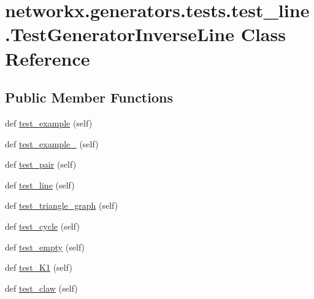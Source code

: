 \hypertarget{classnetworkx_1_1generators_1_1tests_1_1test__line_1_1TestGeneratorInverseLine}{}\section{networkx.\+generators.\+tests.\+test\+\_\+line.\+Test\+Generator\+Inverse\+Line Class Reference}
\label{classnetworkx_1_1generators_1_1tests_1_1test__line_1_1TestGeneratorInverseLine}
\subsection*{Public Member Functions}
\begin{DoxyCompactItemize}
\item 
def \hyperlink{classnetworkx_1_1generators_1_1tests_1_1test__line_1_1TestGeneratorInverseLine_ae43d20786b51e5f61dabfa7b3142d4b0}{test\+\_\+example} (self)
\item 
def \hyperlink{classnetworkx_1_1generators_1_1tests_1_1test__line_1_1TestGeneratorInverseLine_abacb88eeade01b3c8337c685ba076bc1}{test\+\_\+example\+\_} (self)
\item 
def \hyperlink{classnetworkx_1_1generators_1_1tests_1_1test__line_1_1TestGeneratorInverseLine_a4d26eb74ffa49fd4e2bc549fc891de16}{test\+\_\+pair} (self)
\item 
def \hyperlink{classnetworkx_1_1generators_1_1tests_1_1test__line_1_1TestGeneratorInverseLine_aa2f8fe49ca305949514541aa38909f74}{test\+\_\+line} (self)
\item 
def \hyperlink{classnetworkx_1_1generators_1_1tests_1_1test__line_1_1TestGeneratorInverseLine_abc7af832f01b25a51948c7abd44c7343}{test\+\_\+triangle\+\_\+graph} (self)
\item 
def \hyperlink{classnetworkx_1_1generators_1_1tests_1_1test__line_1_1TestGeneratorInverseLine_ab15f1cf1f711f0507222b94ee1c44099}{test\+\_\+cycle} (self)
\item 
def \hyperlink{classnetworkx_1_1generators_1_1tests_1_1test__line_1_1TestGeneratorInverseLine_a3b026f89b01842897e384608ac8cf7c5}{test\+\_\+empty} (self)
\item 
def \hyperlink{classnetworkx_1_1generators_1_1tests_1_1test__line_1_1TestGeneratorInverseLine_a96fdf21c44f06ade5ce4a87bb13d26ca}{test\+\_\+\+K1} (self)
\item 
def \hyperlink{classnetworkx_1_1generators_1_1tests_1_1test__line_1_1TestGeneratorInverseLine_a5cb6fc2ffc40fd785b30079e4c5b7757}{test\+\_\+claw} (self)

\end{DoxyCompactItemize}
